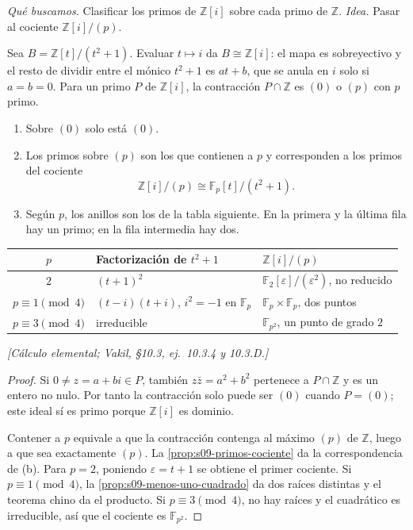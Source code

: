 \emph{Qué buscamos.} Clasificar los primos de $\mathbb Z[i]$ sobre cada primo de $\mathbb Z$. \emph{Idea.} Pasar al cociente $\mathbb Z[i]/(p)$.

\begin{ejem}
\label{ejem:s09-enteros-gaussianos}
Sea $B=\mathbb Z[t]/(t^2+1)$. Evaluar $t\mapsto i$ da $B\cong\mathbb Z[i]$: el mapa es sobreyectivo y el resto de dividir entre el mónico $t^2+1$ es $at+b$, que se anula en $i$ solo si $a=b=0$. Para un primo $P$ de $\mathbb Z[i]$, la contracción $P\cap\mathbb Z$ es $(0)$ o $(p)$ con $p$ primo.
\begin{enumerate}[label=(\alph*)]
\item Sobre $(0)$ solo está $(0)$.
\item Los primos sobre $(p)$ son los que contienen a $p$ y corresponden a los primos del cociente
\[
\mathbb Z[i]/(p)\cong\mathbb F_p[t]/(t^2+1).
\]
\item Según $p$, los anillos son los de la tabla siguiente. En la primera y la última fila hay un primo; en la fila intermedia hay dos.
\end{enumerate}
\begin{center}
\small
\renewcommand{\arraystretch}{1.25}
\begin{tabular}{cll}
\hline
$p$ & Factorización de $t^2+1$ & $\mathbb Z[i]/(p)$\\
\hline
$2$ & $(t+1)^2$ & $\mathbb F_2[\varepsilon]/(\varepsilon^2)$, no reducido\\
$p\equiv1\pmod4$ & $(t-i)(t+i)$, $i^2=-1$ en $\mathbb F_p$ & $\mathbb F_p\times\mathbb F_p$, dos puntos\\
$p\equiv3\pmod4$ & irreducible & $\mathbb F_{p^2}$, un punto de grado $2$\\
\hline
\end{tabular}
\end{center}
\emph{[Cálculo elemental; Vakil, \S10.3, ej.~10.3.4 y 10.3.D.]}
\end{ejem}
\begin{proof}
Si $0\ne z=a+bi\in P$, también $z\bar z=a^2+b^2$ pertenece a $P\cap\mathbb Z$ y es un entero no nulo. Por tanto la contracción solo puede ser $(0)$ cuando $P=(0)$; este ideal sí es primo porque $\mathbb Z[i]$ es dominio.

Contener a $p$ equivale a que la contracción contenga al máximo $(p)$ de $\mathbb Z$, luego a que sea exactamente $(p)$. La \cref{prop:s09-primos-cociente} da la correspondencia de (b). Para $p=2$, poniendo $\varepsilon=t+1$ se obtiene el primer cociente. Si $p\equiv1\pmod4$, la \cref{prop:s09-menos-uno-cuadrado} da dos raíces distintas y el teorema chino da el producto. Si $p\equiv3\pmod4$, no hay raíces y el cuadrático es irreducible, así que el cociente es $\mathbb F_{p^2}$.
\end{proof}

